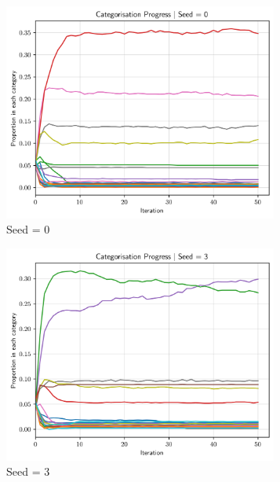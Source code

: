 \documentclass[11pt]{amsart}
\begin{document}
\begin{figure}[h]
    \centering
    \begin{subfigure}[b]{0.32\textwidth}
        \centering
        \includegraphics[width=0.99\textwidth]{../plots/d_progress_seed_0.png}
        \caption{Seed = 0}
    \end{subfigure}
    \hfill
    \begin{subfigure}[b]{0.32\textwidth}
        \centering
        \includegraphics[width=0.99\textwidth]{../plots/d_progress_seed_3.png}
        \caption{Seed = 3}
    \end{subfigure}
    \hfill
    \begin{subfigure}[b]{0.32\textwidth}

\end{subfigure}
\end{figure}
\end{document}
